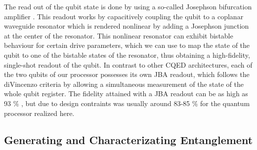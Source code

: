 The read out of the qubit state is done by using a so-called Josephson bifurcation amplifier \citep{siddiqi_dispersive_2006,mallet_single-shot_2009}. This readout works by capacitively coupling the qubit to a coplanar waveguide resonator which is rendered nonlinear by adding a Josephson junction at the center of the resonator. This nonlinear resonator can exhibit bistable behaviour for certain drive parameters, which we can use to map the state of the qubit to one of the bistable states of the resonator, thus obtaining a high-fidelity, single-shot readout of the qubit. In contrast to other CQED architectures, each of the two qubits of our processor possesses its own JBA readout, which follows the diVincenzo criteria by allowing a simultaneous measurement of the state of the whole qubit register. The fidelity attained with a JBA readout can be as high as 93 \% \citep{mallet_single-shot_2009}, but due to design contraints was usually around 83-85 \% for the quantum processor realized here.

\subsection{Generating and Characterizating Entanglement}

